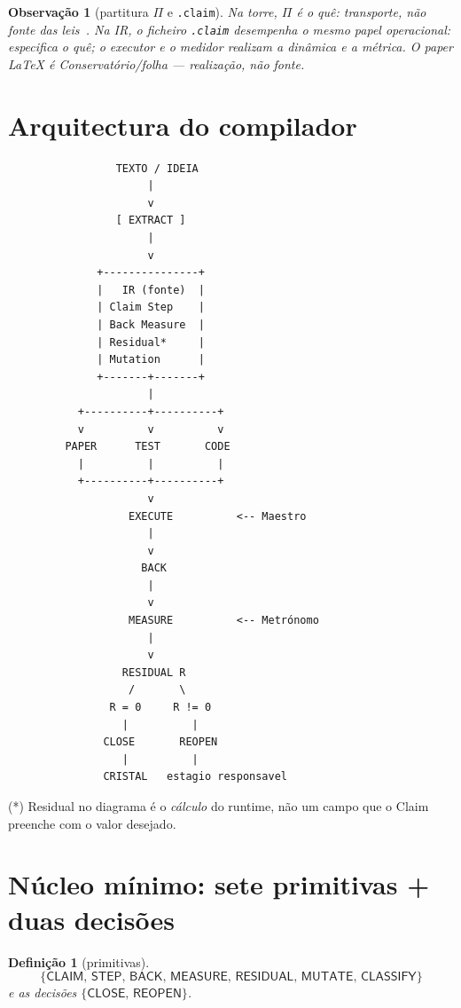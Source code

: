 \documentclass[11pt,a4paper]{article}
\newcommand{\code}[1]{\texttt{\small #1}}
\newtheorem{definicao}[teorema]{Definição}
\newtheorem{observacao}[teorema]{Observação}
\begin{document}
\begin{observacao}[partitura $\Pi$ e \code{*.claim}]
Na torre, $\Pi$ é o \emph{quê}: transporte, não fonte das leis~\cite{peano}.
Na IR, o ficheiro \code{.claim} desempenha o mesmo papel operacional: especifica
o quê; o executor e o medidor realizam a dinâmica e a métrica. O paper LaTeX é
Conservatório/folha --- realização, não fonte.
\end{observacao}

\section{Arquitectura do compilador}\label{sec:arch}

\begin{verbatim}
                 TEXTO / IDEIA
                      |
                      v
                 [ EXTRACT ]
                      |
                      v
              +---------------+
              |   IR (fonte)  |
              | Claim Step    |
              | Back Measure  |
              | Residual*     |
              | Mutation      |
              +-------+-------+
                      |
           +----------+----------+
           v          v          v
         PAPER      TEST       CODE
           |          |          |
           +----------+----------+
                      v
                   EXECUTE          <-- Maestro
                      |
                      v
                     BACK
                      |
                      v
                   MEASURE          <-- Metrónomo
                      |
                      v
                  RESIDUAL R
                   /       \
                R = 0     R != 0
                  |          |
               CLOSE       REOPEN
                  |          |
               CRISTAL   estagio responsavel
\end{verbatim}
\noindent (*) Residual no diagrama é o \emph{cálculo} do runtime, não um campo
que o Claim preenche com o valor desejado.

\section{Núcleo mínimo: sete primitivas + duas decisões}\label{sec:nucleo}

\begin{definicao}[primitivas]\label{def:prim}
\[
\{\mathsf{CLAIM},\,\mathsf{STEP},\,\mathsf{BACK},\,\mathsf{MEASURE},\,
\mathsf{RESIDUAL},\,\mathsf{MUTATE},\,\mathsf{CLASSIFY}\}
\]
e as decisões $\{\mathsf{CLOSE},\,\mathsf{REOPEN}\}$.
\end{definicao}
\end{document}
